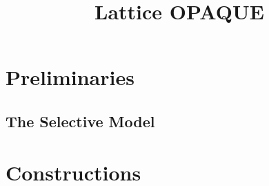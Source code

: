 \documentclass{article}
\author{}
\title{Lattice OPAQUE}
\begin{document}
    \maketitle	
   
%    
    
   \section{Preliminaries}
   \label{sec:prelims}
   

    \subsection{The Selective Model}
    \label{sec:model}
   
    
     \section{Constructions}
    \label{sec:constructions}
    

 
    
    
    

    \appendix
 
 
\end{document}
